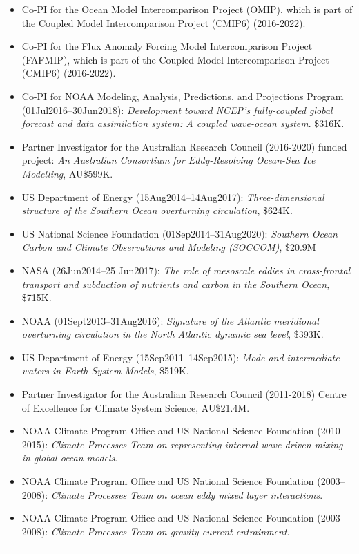 \documentclass{article}
\begin{document}
\begin{itemize}[leftmargin=*]
\item Co-PI for the Ocean Model Intercomparison Project (OMIP), which is part of the Coupled Model Intercomparison Project (CMIP6) (2016-2022).    

\item Co-PI for the Flux Anomaly Forcing Model Intercomparison Project (FAFMIP), which is part of the Coupled Model Intercomparison Project (CMIP6) (2016-2022).    

\item Co-PI for NOAA Modeling, Analysis, Predictions, and Projections Program (01Jul2016--30Jun2018): {\it Development toward NCEP's fully-coupled global forecast and data assimilation system: A coupled wave-ocean system}.  \$316K.

\item Partner Investigator for the  Australian Research Council (2016-2020) funded project: {\it An Australian Consortium for Eddy-Resolving Ocean-Sea Ice Modelling}, AU\$599K.

\item US Department of Energy (15Aug2014--14Aug2017): {\it Three-dimensional structure of the Southern Ocean overturning circulation},  \$624K.

\item US National Science Foundation (01Sep2014--31Aug2020): {\it Southern Ocean Carbon and Climate Observations and Modeling (SOCCOM)}, \$20.9M

\item NASA (26Jun2014--25 Jun2017): {\it The role of mesoscale eddies in cross-frontal transport and subduction of nutrients and carbon in the Southern Ocean}, \$715K.

\item NOAA (01Sept2013--31Aug2016): {\it Signature of the Atlantic meridional overturning circulation in the North Atlantic dynamic sea level}, \$393K.

\item US Department of Energy (15Sep2011--14Sep2015): {\it Mode and intermediate waters in Earth System Models}, \$519K.

\item Partner Investigator for the Australian Research Council (2011-2018) Centre of Excellence for Climate System Science, AU\$21.4M.
  
\item NOAA Climate Program Office and US National Science Foundation (2010--2015): {\it Climate Processes Team on representing internal-wave driven mixing in global ocean models}.

\item NOAA Climate Program Office and US National Science Foundation (2003--2008): {\it Climate Processes Team on ocean eddy mixed layer interactions}.

\item NOAA Climate Program Office and US National Science Foundation (2003--2008): {\it Climate Processes Team on gravity current entrainment}.

\end{itemize}



\noindent\rule{\textwidth}{1pt}
\vspace{-1cm}
%

\end{document}
